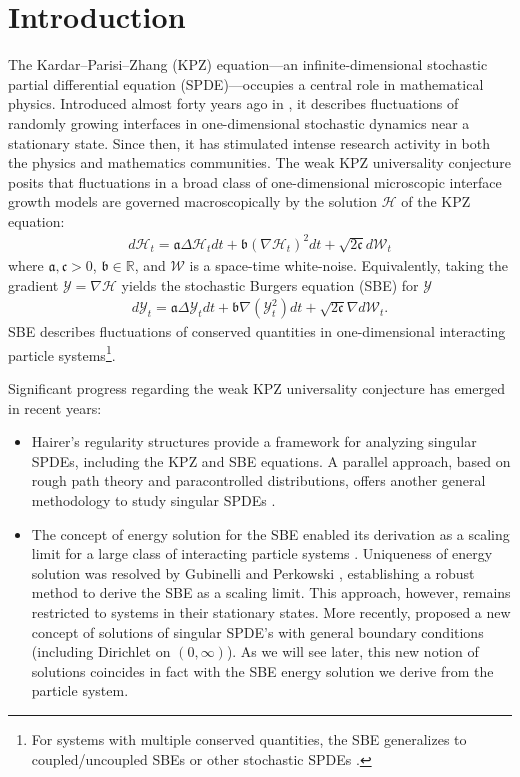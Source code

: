 \documentclass[a4paper, reqno, 12pt]{amsart}
\theoremstyle{plain}
\theoremstyle{definition}
\begin{document}
\section{Introduction}
The Kardar--Parisi--Zhang (KPZ) equation---an infinite-dimensional stochastic partial differential equation (SPDE)---occupies a central role in mathematical physics. Introduced almost forty years ago in \cite{KPZ86}, it describes fluctuations of randomly growing interfaces in one-dimensional stochastic dynamics near a stationary state. Since then, it has stimulated intense research activity in both the physics and mathematics communities. The weak KPZ universality conjecture \cite{C12, QS15} posits that fluctuations in a broad class of one-dimensional microscopic interface growth models are governed macroscopically by the solution $\mathcal H$ of the KPZ equation:\begin{align*}
    d\mathcal H_t = \mathfrak{a}\Delta\mathcal H_tdt + \mathfrak{b} (\nabla \mathcal H_t)^2dt + \sqrt{2\mathfrak{c}}  d\mathcal W_t
\end{align*} where $\mathfrak a, \mathfrak c >0$, $\mathfrak b \in\mathbb{R}$, and $\mathcal W$ is a space-time white-noise. Equivalently, taking the gradient $\mathcal Y = \nabla \mathcal H$ yields the stochastic Burgers equation (SBE) for $\mathcal Y$
\begin{align*}
    d\mathcal{Y}_t = \mathfrak{a}\Delta\mathcal{Y}_tdt + \mathfrak{b} \nabla(\mathcal{Y}_t^2)dt + \sqrt{2\mathfrak{c}} \nabla d\mathcal W_t.
\end{align*}
SBE describes fluctuations of conserved quantities in one-dimensional interacting particle systems\footnote{For systems with multiple conserved quantities, the SBE generalizes to coupled/uncoupled SBEs \cite{BFS21, BF22,H24} or other stochastic SPDEs \cite{GH23, CGMO25}.}.

\bigskip

Significant progress regarding the weak KPZ universality conjecture has emerged in recent years:\\

\begin{itemize}
    \item[1.] Hairer's regularity structures \cite{H14} provide a framework for analyzing singular SPDEs, including the KPZ and SBE equations. A parallel approach, based on rough path theory and paracontrolled distributions, offers another general methodology to study singular SPDEs \cite{GP17}.\\
    \item[2.] The concept of energy solution for the SBE \cite{GJ14} enabled its derivation as a scaling limit for a large class of interacting particle systems \cite{GJS15}. Uniqueness of energy solution was resolved by Gubinelli and Perkowski \cite{GP17}, establishing a robust method to derive the SBE as a scaling limit. This approach, however, remains restricted to systems in their stationary states. More recently, \cite{GPP24} proposed a new concept of solutions of singular SPDE's with general boundary conditions (including Dirichlet on $(0,\infty)$). As we will see later, this new notion of solutions coincides in fact with the SBE energy solution we derive from the particle system. 
\end{itemize}
\end{document}
